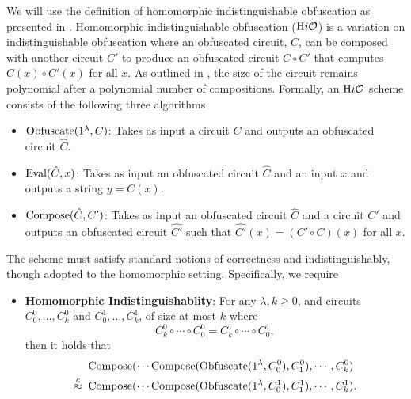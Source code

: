 \begin{definition}
	We will use the definition of homomorphic indistinguishable obfuscation as presented in \cite{bhushan2023homomorphic}.
	Homomorphic indistinguishable obfuscation ($\text{H}i\mathcal{O}$) is a variation on indistinguishable obfuscation where an obfuscated circuit, $C$, can be composed
	with another circuit $C'$ to produce an obfuscated circuit $C \circ C'$ that computes $C(x) \circ C'(x)$ for all $x$.
	As outlined in \cite{bhushan2023homomorphic}, the size of the circuit remains polynomial after a polynomial number of compositions.
	Formally, an $\text{H}i\mathcal{O}$ scheme consists of the following three algorithms
	\begin{itemize}
		\item $\text{Obfuscate}(1^\lambda, C)$: Takes as input a circuit $C$ and outputs an obfuscated circuit $\hat{C}$.
		\item $\text{Eval}(\hat{C}, x)$: Takes as input an obfuscated circuit $\hat{C}$ and an input $x$ and outputs a string $y = C(x)$.
		\item $\text{Compose}(\hat{C}, C')$: Takes as input an obfuscated circuit $\hat{C}$ and a circuit $C'$ and outputs an obfuscated circuit $\hat{C'}$ such that
		$\hat{C'}(x) = (C' \circ C)(x)$ for all $x$.
	\end{itemize}
	The scheme must satisfy standard notions of correctness and indistinguishably, though adopted to the homomorphic setting. Specifically, we require
	\begin{itemize}
		\item \textbf{Homomorphic Indistinguishablity}: For any $\lambda, k \geq 0$, and circuits $C_0^0, \dots, C_k^0$ and $C_0^1, \dots, C_k^1$, of size at most $k$ where
		\begin{equation*}
			C_k^0 \circ \cdots \circ C_0^0 = C_k^1 \circ \cdots \circ C_0^1,	
		\end{equation*}
		then it holds that
		\begin{align*}
			&\text{Compose}(\cdots \text{Compose}(\text{Obfuscate}(1^\lambda, C_0^0), C_1^0), \cdots, C_k^0) \\
			\overset{c}{\approx} \;\;
			&\text{Compose}(\cdots \text{Compose}(\text{Obfuscate}(1^\lambda, C_0^1), C_1^1), \cdots, C_k^1).	
		\end{align*}
	\end{itemize}
\end{definition}